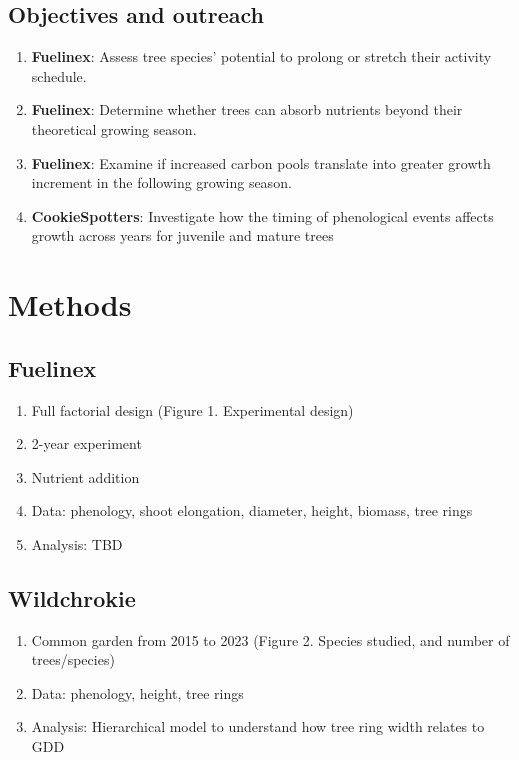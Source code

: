\documentclass{article}
\begin{document}
\subsection *{Objectives and outreach}
\begin {enumerate}
	\item \textbf{Fuelinex}: Assess tree species’ potential to prolong or stretch their activity schedule.
	\item \textbf{Fuelinex}:  Determine whether trees can absorb nutrients beyond their theoretical growing season.
	\item \textbf{Fuelinex}:  Examine if increased carbon pools translate into greater growth increment in the following growing season. 
	\item \textbf{CookieSpotters}: Investigate how the timing of phenological events affects growth across years for juvenile and mature trees
\end {enumerate}

\section{Methods}

\subsection {Fuelinex}
\begin {enumerate}
	\item Full factorial design (Figure 1. Experimental design)
	\item 2-year experiment 
	\item Nutrient addition
	\item Data: phenology, shoot elongation, diameter, height, biomass, tree rings
	\item Analysis: TBD
\end {enumerate}

\subsection {Wildchrokie}
\begin {enumerate}
	\item Common garden from 2015 to 2023 (Figure 2. Species studied, and number of trees/species)
	\item Data: phenology, height, tree rings
	\item Analysis: Hierarchical model to understand how tree ring width relates to GDD
\end {enumerate}
\end{document}
